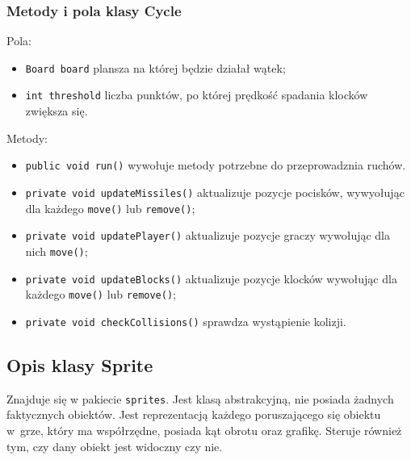 \documentclass[12pt]{report}
\newcommand{\code}[1]{\texttt{#1}}
\begin{document}
\subsubsection{Metody i pola klasy Cycle}
Pola:
\begin{itemize}
    \item \code{Board board} plansza na której będzie działał wątek;
    \item \code{int threshold} liczba punktów, po której prędkość spadania klocków zwiększa się.
\end{itemize}
Metody:
\begin{itemize}
    \item \code{public void run()} wywołuje metody potrzebne do przeprowadznia ruchów.
    \item \code{private void updateMissiles()} aktualizuje pozycje pocisków, wywyołując dla każdego \code{move()} lub \code{remove()};
    \item \code{private void updatePlayer()} aktualizuje pozycje graczy wywołując dla nich \code{move()};
    \item \code{private void updateBlocks()} aktualizuje pozycje klocków wywołując dla każdego \code{move()} lub \code{remove()};
    \item \code{private void checkCollisions()} sprawdza wystąpienie kolizji.
\end{itemize}
\subsection{Opis klasy Sprite}
Znajduje się w pakiecie \code{sprites}. Jest klasą abstrakcyjną, nie posiada żadnych faktycznych obiektów. Jest reprezentacją każdego poruszającego się obiektu w~grze, który ma współrzędne, posiada kąt obrotu oraz grafikę. Steruje również tym, czy dany obiekt jest widoczny czy nie.
\end{document}
